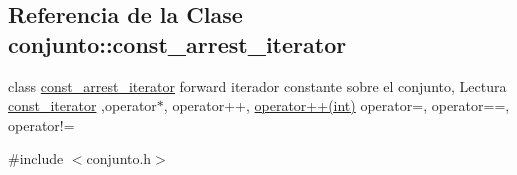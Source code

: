 \hypertarget{classconjunto_1_1const__arrest__iterator}{\subsection{Referencia de la Clase conjunto\-:\-:const\-\_\-arrest\-\_\-iterator}
\label{classconjunto_1_1const__arrest__iterator}
}


class \hyperlink{classconjunto_1_1const__arrest__iterator}{const\-\_\-arrest\-\_\-iterator} forward iterador constante sobre el conjunto, Lectura \hyperlink{classconjunto_1_1const__iterator}{const\-\_\-iterator} ,operator$\ast$, operator++, \hyperlink{classconjunto_1_1const__arrest__iterator_abd10935467e56b74188eacc8b5cebe60}{operator++(int)} operator=, operator==, operator!=  




{\ttfamily \#include $<$conjunto.\-h$>$}

